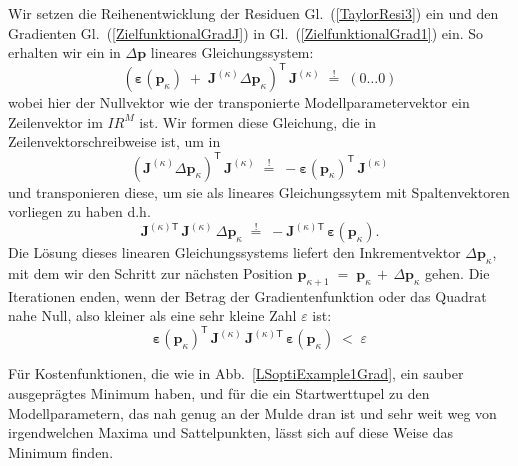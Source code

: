 Wir setzen die Reihenentwicklung der Residuen Gl.~(\ref{TaylorResi3}) ein und
den Gradienten Gl.~(\ref{ZielfunktionalGradJ}) in Gl.~(\ref{ZielfunktionalGrad1}) ein.
So erhalten wir ein in $\Delta \mathbf{p}$ lineares Gleichungssystem:
\begin{equation}
\left( \boldsymbol{\varepsilon}(\mathbf{p}_\kappa)
\; + \; \boldsymbol{J}^{(\kappa)} \Delta \mathbf{p}_\kappa \right)^\textsf{T} \, \boldsymbol{J}^{(\kappa)}
\; \overset{!}{=} \; \left( 0 \dots  0 \right)
\label{GradientQlinGl1}
\end{equation}
wobei hier der Nullvektor wie der transponierte Modellparametervektor ein
Zeilenvektor im $I \! \! R^{M}$ ist.
Wir formen diese Gleichung, die in Zeilenvektorschreibweise ist, um in
\begin{equation}
\left( \boldsymbol{J}^{(\kappa)} \Delta \mathbf{p}_\kappa \right)^\textsf{T} \, \boldsymbol{J}^{(\kappa)}
\; \overset{!}{=} \;
- \boldsymbol{\varepsilon}(\mathbf{p}_\kappa)^\textsf{T} \, \boldsymbol{J}^{(\kappa)}
\label{GradientQlinGl2}
\end{equation}
und transponieren diese, um sie als lineares Gleichungssytem mit Spaltenvektoren vorliegen zu haben
d.h.
\begin{equation}
 \boldsymbol{J}^{(\kappa) \textsf{T}} \, \boldsymbol{J}^{(\kappa)} \, \Delta \mathbf{p}_\kappa
\; \overset{!}{=} \;
-  \boldsymbol{J}^{(\kappa) \textsf{T}} \, \boldsymbol{\varepsilon}(\mathbf{p}_\kappa) .
\label{GradientQlinGl3}
\end{equation}
Die Lösung dieses linearen Gleichungssystems liefert den Inkrementvektor $\Delta \mathbf{p}_\kappa$,
mit dem wir den Schritt zur nächsten Position $\mathbf{p}_{\kappa+1} \; = \; \mathbf{p}_{\kappa} \, + \,
\Delta \mathbf{p}_{\kappa}$ gehen. Die Iterationen enden, wenn der Betrag der Gradientenfunktion oder
das Quadrat nahe Null, also kleiner als eine sehr kleine Zahl $\varepsilon$ ist:
\begin{equation}
 \boldsymbol{\varepsilon}(\mathbf{p}_\kappa)^\mathsf{T}
\, \boldsymbol{J}^{(\kappa)} \, \boldsymbol{J}^{(\kappa) \textsf{T}} \, \boldsymbol{\varepsilon}(\mathbf{p}_\kappa) \;
< \; \varepsilon
\end{equation}

Für Kostenfunktionen, die wie in Abb.~\ref{LSoptiExample1Grad}, ein sauber ausgeprägtes Minimum
haben, und für die ein Startwerttupel zu den Modellparametern, das nah genug an der Mulde dran ist und
sehr weit weg von irgendwelchen Maxima und Sattelpunkten, lässt sich auf diese Weise das Minimum
finden.

